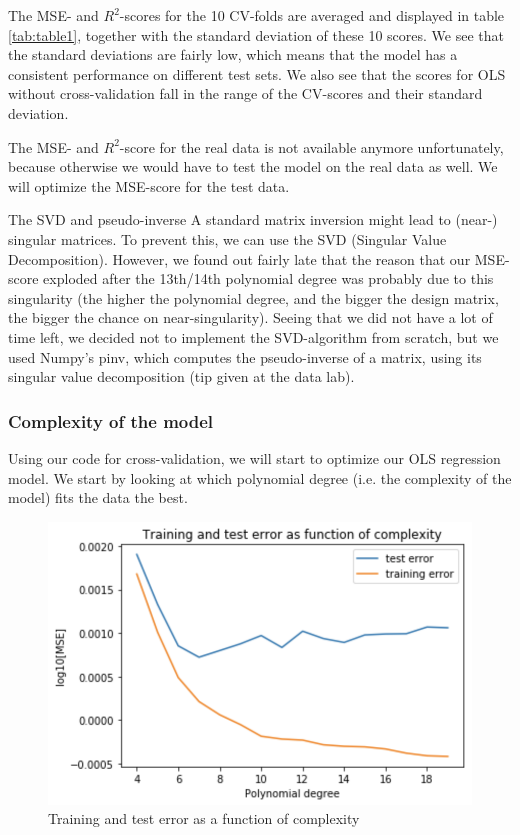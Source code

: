 \documentclass[12pt]{extarticle}
\begin{document}
The MSE- and $R^2$-scores for the 10 CV-folds are averaged and displayed in table \ref{tab:table1}, together with the standard deviation of these 10 scores. We see that the standard deviations are fairly low, which means that the model has a consistent performance on different test sets. We also see that the scores for OLS without cross-validation fall in the range of the CV-scores and their standard deviation. 

The MSE- and $R^2$-score for the real data is not available anymore unfortunately, because otherwise we would have to test the model on the real data as well. We will optimize the MSE-score for the test data.

The SVD and pseudo-inverse
A standard matrix inversion might lead to (near-) singular matrices. To prevent this, we can use the SVD (Singular Value Decomposition). However, we found out fairly late that the reason that our MSE-score exploded after the 13th/14th polynomial degree was probably due to this singularity (the higher the polynomial degree, and the bigger the design matrix, the bigger the chance on near-singularity). Seeing that we did not have a lot of time left, we decided not to implement the SVD-algorithm from scratch, but we used Numpy’s pinv, which computes the pseudo-inverse of a matrix, using its singular value decomposition (tip given at the data lab).

\subsubsection{Complexity of the model}

Using our code for cross-validation, we will start to optimize our OLS regression model. We start by looking at which polynomial degree (i.e. the complexity of the model) fits the data the best.

\begin{figure}
    \centering
    \includegraphics{3}
    \caption{Training and test error as a function of complexity}
    \label{fig:f4}
\end{figure}
\end{document}
